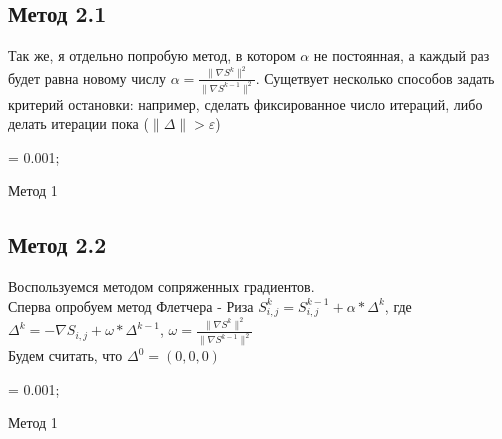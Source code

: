 \documentclass[ 12pt,x11names]{article}
\begin{document}
    \subsection{Метод 2.1}
    Так же, я  отдельно попробую метод, в котором  $\alpha$ не постоянная, а каждый раз будет равна новому числу
     $\alpha  = \frac{\| \nabla S^k \|^2}{\| \nabla S^{k-1} \|^2}$.
    Сущетвует несколько способов задать критерий остановки: например, сделать фиксированное число итераций, либо делать итерации пока  ($\| \Delta \|> \varepsilon$)\\
    \begin{algorithm}[H]
		\SetAlgoLined
		\alpha = 0.001;\\
	\caption{Метод 1}
    \end{algorithm}
    \subsection{Метод 2.2}
    Воспользуемся методом сопряженных градиентов.\\
    Сперва опробуем метод Флетчера - Риза
    $S^k_{i, j} = S^{k-1}_{i, j} + \alpha * \Delta^k $, где $\Delta^k = -\nabla S_{i, j} + \omega * \Delta ^  {k-1} $,
    $\omega  = \frac{\| \nabla S^k \|^2}{\| \nabla S^{k-1} \|^2}$\\
    Будем считать, что $\Delta^0=(0,0,0)$\\

    \begin{algorithm}[H]
		\SetAlgoLined
		\alpha = 0.001;\\
	\caption{Метод 1}
    \end{algorithm}
\end{document}
